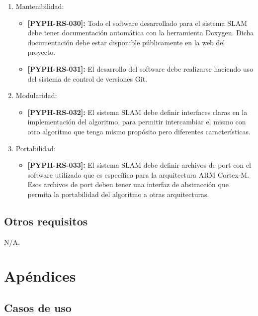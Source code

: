 \documentclass[12pt,a4paper, twosite]{article}
\begin{document}
\begin{enumerate}
  \item Mantenibilidad:
  \begin{itemize}
    \item \textbf{[PYPH-RS-030]:} Todo el software desarrollado para el sistema SLAM debe
    tener documentación automática con la herramienta Doxygen. Dicha documentación debe estar
    disponible públicamente en la web del proyecto.
    \item \textbf{[PYPH-RS-031]:} El desarrollo del software debe realizarse haciendo uso del
    sistema de control de versiones Git.
  \end{itemize}
  \item Modularidad:
  \begin{itemize}
    \item \textbf{[PYPH-RS-032]:} El sistema SLAM debe definir interfaces claras en la
    implementación del algoritmo, para permitir intercambiar el mismo con otro algoritmo
    que tenga mismo propósito pero diferentes características.
  \end{itemize}
  \item Portabilidad:
  \begin{itemize}
    \item \textbf{[PYPH-RS-033]:} El sistema SLAM debe definir archivos de port con el
    software utilizado que es específico para la arquitectura ARM Cortex-M. Esos archivos de
    port deben tener una interfaz de abstracción que permita la portabilidad del algoritmo
    a otras arquitecturas.
  \end{itemize}
\end{enumerate}

\subsection{Otros requisitos}
\label{sec:org31d2978}


N/A.

\newpage


\section{Apéndices}
\label{sec:org75cea03}

\subsection{Casos de uso}
\label{sec:usecases}
\end{document}
